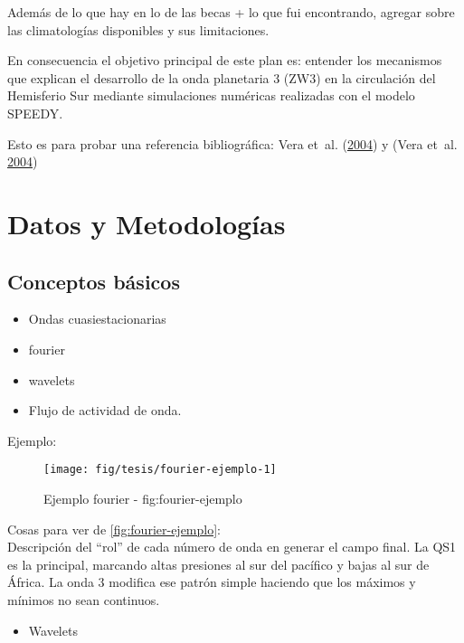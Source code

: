 \documentclass[spanish,a4paper]{book}
\providecommand{\tightlist}{%
  \setlength{\itemsep}{0pt}\setlength{\parskip}{0pt}}
\begin{document}
Además de lo que hay en lo de las becas + lo que fui encontrando,
agregar sobre las climatologías disponibles y sus limitaciones.

En consecuencia el objetivo principal de este plan es: entender los
mecanismos que explican el desarrollo de la onda planetaria 3 (ZW3) en
la circulación del Hemisferio Sur mediante simulaciones numéricas
realizadas con el modelo SPEEDY.

Esto es para probar una referencia bibliográfica: Vera et~al.
(\protect\hyperlink{ref-Vera2004}{2004}) y (Vera et~al.
\protect\hyperlink{ref-Vera2004}{2004})

\chapter{Datos y Metodologías}\label{datos-y-metodologias}


\section{Conceptos básicos}\label{conceptos-basicos}

\begin{itemize}
\tightlist
\item
  Ondas cuasiestacionarias
\item
  fourier
\item
  wavelets
\item
  Flujo de actividad de onda.
\end{itemize}


Ejemplo:

\begin{figure*}
\texttt{[image: fig/tesis/fourier-ejemplo-1]} \caption{Ejemplo fourier - fig:fourier-ejemplo}\label{fig:fourier-ejemplo}
\end{figure*}

Cosas para ver de \autoref{fig:fourier-ejemplo}:\\
Descripción del ``rol'' de cada número de onda en generar el campo
final. La QS1 es la principal, marcando altas presiones al sur del
pacífico y bajas al sur de África. La onda 3 modifica ese patrón simple
haciendo que los máximos y mínimos no sean continuos.

\begin{itemize}
\tightlist
\item
  Wavelets
\end{itemize}
\end{document}
